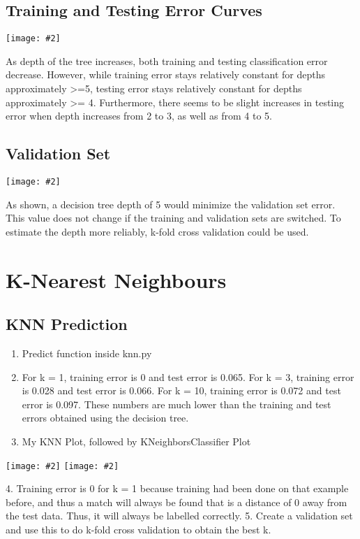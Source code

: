 \documentclass{article}
\newcommand{\fig}[2]{\texttt{[image: \#2]}}
\def\enum#1{\begin{enumerate}#1\end{enumerate}}
\begin{document}
\subsection{Training and Testing Error Curves}
\fig{1}{training_and_testing_errors}

As depth of the tree increases, both training and testing classification error decrease. However, while training error stays relatively constant for depths approximately >=5, testing error stays relatively constant for depths approximately >= 4. Furthermore, there seems to be slight increases in testing error when depth increases from 2 to 3, as well as from 4 to 5.

\subsection{Validation Set}
\fig{1}{training_and_validation_error}

As shown, a decision tree depth of 5 would minimize the validation set error. This value does not change if the training and validation sets are switched. To estimate the depth more reliably, k-fold cross validation could be used.


\section{K-Nearest Neighbours}

\subsection{KNN Prediction}

\enum{
\item Predict function inside knn.py
\item For k = 1, training error is 0 and test error is 0.065. For k = 3, training error is 0.028 and test error is 0.066. For k = 10, training error is 0.072 and test error is 0.097. These numbers are much lower than the training and test errors obtained using the decision tree.
\item My KNN Plot, followed by KNeighborsClassifier Plot
}
\fig{1}{myKNNplot}
\fig{1}{KNNeighboursPlot}

4.   Training error is 0 for k = 1 because training had been done on that example before, and thus a match will always be found that is a distance of 0 away from the test data. Thus, it will always be labelled correctly.
5.   Create a validation set and use this to do k-fold cross validation to obtain the best k.
\end{document}
